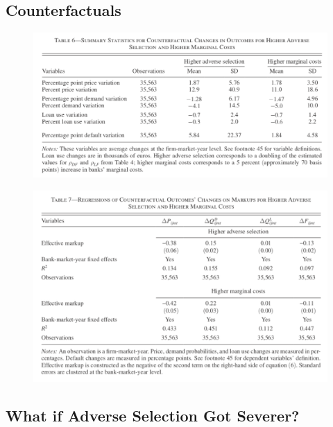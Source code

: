 \documentclass[]{book}
\begin{document}
\subsection{Counterfactuals}\label{counterfactuals}

\begin{figure}
\centering
\includegraphics{figuretable/Crawford_2018_Table6.png}
\caption{}
\end{figure}

\begin{figure}
\centering
\includegraphics{figuretable/Crawford_2018_Table7.png}
\caption{}
\end{figure}

\subsection{What if Adverse Selection Got
Severer?}\label{what-if-adverse-selection-got-severer}
\end{document}
